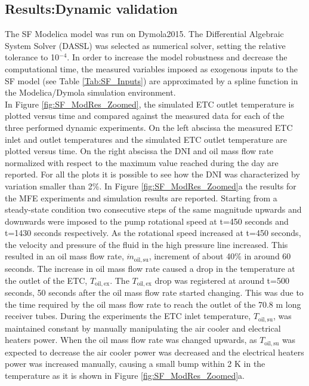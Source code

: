\documentclass[final,3p,times,review]{elsarticle}
\begin{document}
\subsection{Results:Dynamic validation}
%
The SF Modelica model was run on Dymola2015. The Differential Algebraic System Solver (DASSL) \cite{Petzold1983} was selected as numerical solver, setting the relative tolerance to 10$^{-4}$. In order to increase the model robustness and decrease the computational time, the measured variables imposed as exogenous inputs to the SF model (see Table \ref{Tab:SF_Inputs}) are approximated by a spline function in the Modelica/Dymola simulation environment.\\
In Figure \ref{fig:SF_ModRes_Zoomed}, the simulated ETC outlet temperature is plotted versus time and compared against the measured data for each of the three performed dynamic experiments. On the left abscissa the measured ETC inlet and outlet temperatures and the simulated ETC outlet temperature are plotted versus time. On the right abscissa the DNI and oil mass flow rate normalized with respect to the maximum value reached during the day are reported. For all the plots it is possible to see how the DNI was characterized by variation smaller than 2\%. In Figure \ref{fig:SF_ModRes_Zoomed}a the results for the MFE experiments and simulation results are reported. Starting from a steady-state condition two consecutive steps of the same magnitude upwards and downwards were imposed to the pump rotational speed at t=450 seconds and t=1430 seconds respectively. As the rotational speed increased at t=450 seconds, the velocity and pressure of the fluid in the high pressure line increased. This resulted in an oil mass flow rate, $\dot{m}_\mathrm{oil,su}$, increment of about 40\% in around 60 seconds. The increase in oil mass flow rate caused a drop in the temperature at the outlet of the ETC, $T_\mathrm{oil,ex}$. The $T_\mathrm{oil,ex}$ drop was registered at around t=500 seconds, 50 seconds after the oil mass flow rate started changing. This was due to the time required by the oil mass flow rate to reach the outlet of the 70.8 m long receiver tubes. During the experiments the ETC inlet temperature, $T_\mathrm{oil,su}$, was maintained constant  by manually manipulating the air cooler and electrical heaters power. 
When the oil mass flow rate was changed upwards, as $T_\mathrm{oil,su}$ was expected to decrease the air cooler power was 
decreased and the electrical heaters power was increased manually, causing a small bump within 2 K in the temperature as it is shown in Figure \ref{fig:SF_ModRes_Zoomed}a.  
\end{document}
